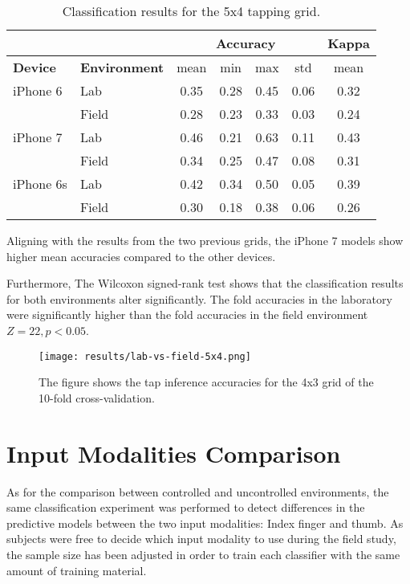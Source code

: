 \begin{table}[h!]
  \centering
\begin{tabular}{|l|l|c|c|c|c|c|}
  \cline{3-7}
  \multicolumn{2}{c}{} & \multicolumn{4}{|c|}{\textbf{Accuracy}} & \textbf{Kappa} \\
  \hline
  \textbf{Device} & \textbf{Environment} & mean &   min &   max  & std &  mean \\
  \hline
  iPhone 6 & Lab &      0.35 &     0.28 &     0.45 &     0.06 &        0.32 \\
  & Field &      0.28 &     0.23 &     0.33 &     0.03 &        0.24 \\
  \hline
iPhone 7 & Lab &      0.46 &     0.21 &     0.63 &     0.11 &        0.43 \\
  & Field &      0.34 &     0.25 &     0.47 &     0.08 &        0.31 \\
  \hline
iPhone 6s & Lab &      0.42 &     0.34 &     0.50 &     0.05 &        0.39 \\
  & Field &      0.30 &     0.18 &     0.38 &     0.06 &        0.26 \\
  \hline
\end{tabular}
  \caption{Classification results for the 5x4 tapping grid.}
\end{table}

Aligning with the results from the two previous grids, the iPhone 7 models show higher mean accuracies compared to the other devices. 

Furthermore, The Wilcoxon signed-rank test shows that the classification results for both environments alter significantly. The fold accuracies in the laboratory were significantly higher than the fold accuracies in the field environment $Z = 22, p < 0.05$.

\begin{figure}[h!]
  \centering
  \texttt{[image: results/lab-vs-field-5x4.png]}
  \caption{The figure shows the tap inference accuracies for the 4x3 grid of the 10-fold cross-validation.} \label{fig:participation}
\end{figure}

\section{Input Modalities Comparison}
As for the comparison between controlled and uncontrolled environments, the same classification experiment was performed to detect differences in the predictive models between the two input modalities: Index finger and thumb. As subjects were free to decide which input modality to use during the field study, the sample size has been adjusted in order to train each classifier with the same amount of training material. 

